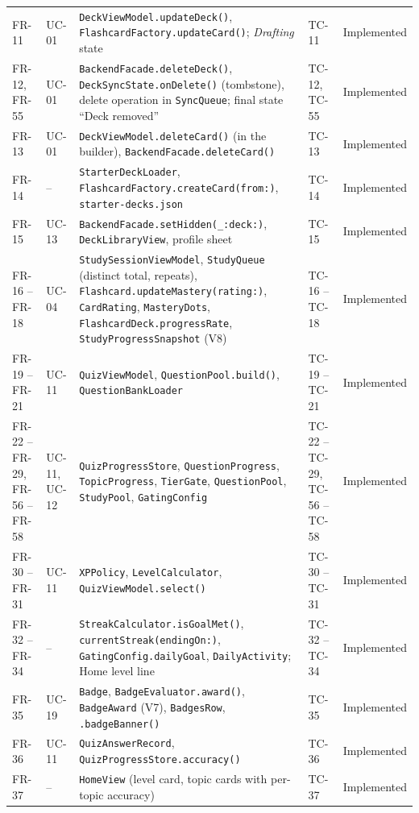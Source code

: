 \documentclass[12pt,letterpaper]{article}
\begin{document}
\begin{xltabular}{\textwidth}{@{}l L{1.6cm} Y L{2.0cm} L{1.9cm}@{}}
FR-11 & UC-01 & \texttt{DeckViewModel.updateDeck()}, \texttt{FlashcardFactory.updateCard()}; \emph{Drafting} state & TC-11 & Implemented \\
FR-12, FR-55 & UC-01 & \texttt{BackendFacade.deleteDeck()}, \texttt{DeckSyncState.onDelete()} (tombstone), delete operation in \texttt{SyncQueue}; final state ``Deck removed'' & TC-12, TC-55 & Implemented \\
FR-13 & UC-01 & \texttt{DeckViewModel.deleteCard()} (in the builder), \texttt{BackendFacade.deleteCard()} & TC-13 & Implemented \\
FR-14 & -- & \texttt{StarterDeckLoader}, \texttt{FlashcardFactory.createCard(from:)}, \texttt{starter-decks.json} & TC-14 & Implemented \\
FR-15 & UC-13 & \texttt{BackendFacade.setHidden(\_:deck:)}, \texttt{DeckLibraryView}, profile sheet & TC-15 & Implemented \\
FR-16 -- FR-18 & UC-04 & \texttt{StudySessionViewModel}, \texttt{StudyQueue} (distinct total, repeats), \texttt{Flashcard.updateMastery(rating:)}, \texttt{CardRating}, \texttt{MasteryDots}, \texttt{FlashcardDeck.progressRate}, \texttt{StudyProgressSnapshot} (V8) & TC-16 -- TC-18 & Implemented \\
FR-19 -- FR-21 & UC-11 & \texttt{QuizViewModel}, \texttt{QuestionPool.build()}, \texttt{QuestionBankLoader} & TC-19 -- TC-21 & Implemented \\
FR-22 -- FR-29, FR-56 -- FR-58 & UC-11, UC-12 & \texttt{QuizProgressStore}, \texttt{QuestionProgress}, \texttt{TopicProgress}, \texttt{TierGate}, \texttt{QuestionPool}, \texttt{StudyPool}, \texttt{GatingConfig} & TC-22 -- TC-29, TC-56 -- TC-58 & Implemented \\
FR-30 -- FR-31 & UC-11 & \texttt{XPPolicy}, \texttt{LevelCalculator}, \texttt{QuizViewModel.select()} & TC-30 -- TC-31 & Implemented \\
FR-32 -- FR-34 & -- & \texttt{StreakCalculator.isGoalMet()}, \texttt{currentStreak(endingOn:)}, \texttt{GatingConfig.dailyGoal}, \texttt{DailyActivity}; Home level line & TC-32 -- TC-34 & Implemented \\
FR-35 & UC-19 & \texttt{Badge}, \texttt{BadgeEvaluator.award()}, \texttt{BadgeAward} (V7), \texttt{BadgesRow}, \texttt{.badgeBanner()} & TC-35 & Implemented \\
FR-36 & UC-11 & \texttt{QuizAnswerRecord}, \texttt{QuizProgressStore.accuracy()} & TC-36 & Implemented \\
FR-37 & -- & \texttt{HomeView} (level card, topic cards with per-topic accuracy) & TC-37 & Implemented \\

\end{xltabular}
\end{document}

